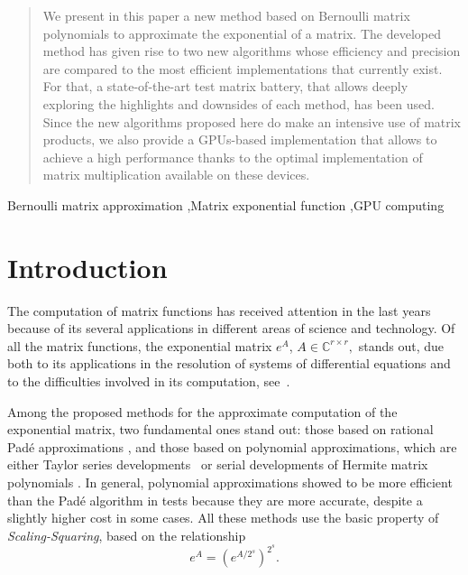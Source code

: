 \documentclass[preprint,10pt,numbers,sort&compress]{elsarticle}
\begin{document}
\begin{frontmatter}

\begin{abstract}
We present in this paper a new method based on Bernoulli matrix polynomials to approximate the exponential of a matrix. 
The developed method has given rise to two new algorithms whose efficiency and precision are compared to the most efficient implementations that currently exist. For that, a state-of-the-art test matrix battery, that allows deeply exploring the highlights and downsides of each method, has been used. 
Since the new algorithms proposed here do make an intensive use of matrix products, we also provide a GPUs-based implementation that allows to achieve a high performance thanks to the optimal implementation of matrix multiplication available on these devices.
\end{abstract}

\begin{keyword}


 Bernoulli matrix approximation \sep Matrix exponential function \sep GPU computing
\end{keyword}

\end{frontmatter}



\section{Introduction}
The computation of matrix functions has received attention in the last years because of its several applications in different areas of science and technology. Of all the matrix functions, the exponential matrix $e^A$, $A \in \mathbb{C}^{r \times r},$ stands out, due both to its applications in the resolution of systems of differential equations and to the difficulties involved in its computation, see~\cite{Vanl75,MoVa78,MoVa03,High08}.

Among the proposed methods for the approximate computation of the exponential matrix, two fundamental ones stand out: those based on rational Pad\'e approximations \cite{BaGr96,DiPa00,AlHi09,High04}, and those based on polynomial approximations, which are either Taylor series developments~\cite{sastre2015new,SIDR11,RSID16,sastre2019boosting} or serial developments of Hermite matrix polynomials  \cite{defez1998some,sastre2011efficient}. In general, polynomial approximations showed to be more efficient than the Pad\'e algorithm in tests because they are more accurate, despite a slightly higher cost in some cases. All these methods use the basic property of \emph{Scaling-Squaring}, based on the relationship
$$
e^{A}=\left(e^{A/2^s} \right)^{2^s}.
$$
\end{document}

